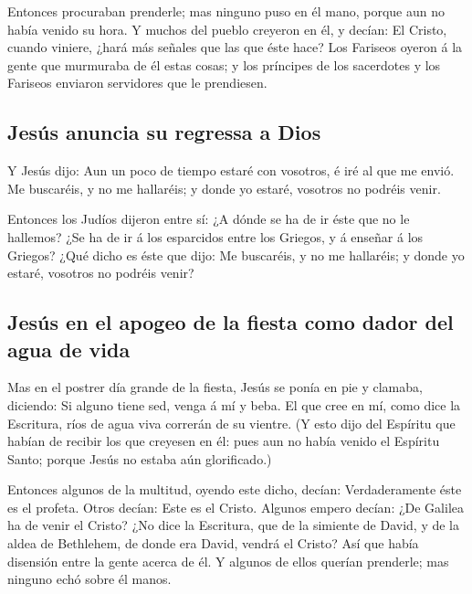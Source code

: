  Entonces procuraban prenderle; mas ninguno puso en él
mano, porque aun no había venido su hora.  Y muchos del
pueblo creyeron en él, y decían: El Cristo, cuando viniere, ¿hará más
señales que las que éste hace?  Los Fariseos oyeron á la
gente que murmuraba de él estas cosas; y los príncipes de los sacerdotes
y los Fariseos enviaron servidores que le prendiesen.

\hypertarget{jesuxfas-anuncia-su-regressa-a-dios}{%
\subsection{Jesús anuncia su regressa a
Dios}\label{jesuxfas-anuncia-su-regressa-a-dios}}

 Y Jesús dijo: Aun un poco de tiempo estaré con vosotros,
é iré al que me envió.  Me buscaréis, y no me hallaréis;
y donde yo estaré, vosotros no podréis venir.

 Entonces los Judíos dijeron entre sí: ¿A dónde se ha de
ir éste que no le hallemos? ¿Se ha de ir á los esparcidos entre los
Griegos, y á enseñar á los Griegos?  ¿Qué dicho es éste
que dijo: Me buscaréis, y no me hallaréis; y donde yo estaré, vosotros
no podréis venir?

\hypertarget{jesuxfas-en-el-apogeo-de-la-fiesta-como-dador-del-agua-de-vida}{%
\subsection{Jesús en el apogeo de la fiesta como dador del agua de
vida}\label{jesuxfas-en-el-apogeo-de-la-fiesta-como-dador-del-agua-de-vida}}

 Mas en el postrer día grande de la fiesta, Jesús se
ponía en pie y clamaba, diciendo: Si alguno tiene sed, venga á mí y
beba.  El que cree en mí, como dice la Escritura, ríos de
agua viva correrán de su vientre.  (Y esto dijo del
Espíritu que habían de recibir los que creyesen en él: pues aun no había
venido el Espíritu Santo; porque Jesús no estaba aún glorificado.)

 Entonces algunos de la multitud, oyendo este dicho,
decían: Verdaderamente éste es el profeta.  Otros decían:
Este es el Cristo. Algunos empero decían: ¿De Galilea ha de venir el
Cristo?  ¿No dice la Escritura, que de la simiente de
David, y de la aldea de Bethlehem, de donde era David, vendrá el Cristo?
 Así que había disensión entre la gente acerca de él.
 Y algunos de ellos querían prenderle; mas ninguno echó
sobre él manos.

